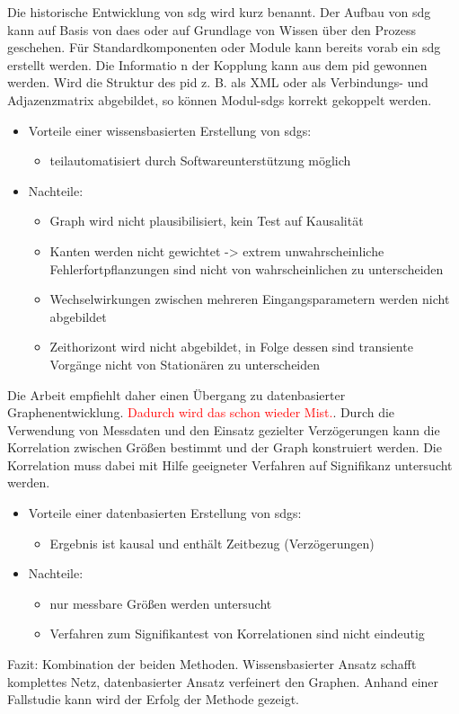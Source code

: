 Die historische Entwicklung von \ac{sdg} wird kurz benannt. Der Aufbau von \ac{sdg} kann auf Basis von \acp{dae} oder auf Grundlage von Wissen \"uber den Prozess geschehen. F\"ur Standardkomponenten oder Module kann bereits vorab ein \ac{sdg} erstellt werden. Die Informatio n der Kopplung kann aus dem \ac{pid} gewonnen werden. Wird die Struktur des \ac{pid} z. B. als XML oder als Verbindungs- und Adjazenzmatrix abgebildet, so k\"onnen Modul-\acp{sdg} korrekt gekoppelt werden.
\begin{itemize}
\item Vorteile einer wissensbasierten Erstellung von \acp{sdg}: 
  \begin{itemize}
  \item teilautomatisiert durch Softwareunterst\"utzung m\"oglich
  \end{itemize}
\item Nachteile: 
  \begin{itemize}
  \item Graph wird nicht plausibilisiert, kein Test auf Kausalit\"at
  \item Kanten werden nicht gewichtet -> extrem unwahrscheinliche Fehlerfortpflanzungen sind nicht von wahrscheinlichen zu unterscheiden
  \item Wechselwirkungen zwischen mehreren Eingangsparametern werden nicht abgebildet
  \item Zeithorizont wird nicht abgebildet, in Folge dessen sind transiente Vorg\"ange nicht von Station\"aren zu unterscheiden
  \end{itemize}   
\end{itemize}
Die Arbeit empfiehlt daher einen \"Ubergang zu datenbasierter Graphenentwicklung. \textcolor{red}{Dadurch wird das schon wieder Mist.}. Durch die Verwendung von Messdaten und den Einsatz gezielter Verz\"ogerungen kann die Korrelation zwischen Gr\"o\ss{}en bestimmt und der Graph konstruiert werden. Die Korrelation muss dabei mit Hilfe geeigneter Verfahren auf Signifikanz untersucht werden. 
\begin{itemize}
\item Vorteile einer datenbasierten Erstellung von \acp{sdg}: 
  \begin{itemize}
  \item Ergebnis ist kausal und enth\"alt Zeitbezug (Verz\"ogerungen)
  \end{itemize}
\item Nachteile: 
  \begin{itemize}
  \item nur messbare Gr\"o\ss{}en werden untersucht
  \item Verfahren zum Signifikantest von Korrelationen sind nicht eindeutig
  \end{itemize}   
\end{itemize}
Fazit: Kombination der beiden Methoden. Wissensbasierter Ansatz schafft komplettes Netz, datenbasierter Ansatz verfeinert den Graphen. Anhand einer Fallstudie kann wird der Erfolg der Methode gezeigt. 

